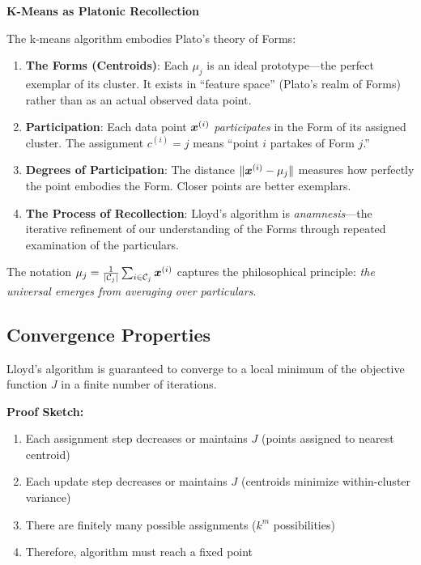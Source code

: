 \begin{philobox}
\textbf{K-Means as Platonic Recollection}

The k-means algorithm embodies Plato's theory of Forms:

\begin{enumerate}
    \item \textbf{The Forms (Centroids)}: Each $\mu_j$ is an ideal prototype---the perfect exemplar of its cluster. It exists in ``feature space'' (Plato's realm of Forms) rather than as an actual observed data point.
    
    \item \textbf{Participation}: Each data point $\bm{x}^{(i)}$ \textit{participates} in the Form of its assigned cluster. The assignment $c^{(i)} = j$ means ``point $i$ partakes of Form $j$.''
    
    \item \textbf{Degrees of Participation}: The distance $\| \bm{x}^{(i)} - \mu_j \|$ measures how perfectly the point embodies the Form. Closer points are better exemplars.
    
    \item \textbf{The Process of Recollection}: Lloyd's algorithm is \textit{anamnesis}---the iterative refinement of our understanding of the Forms through repeated examination of the particulars.
\end{enumerate}

The notation $\mu_j = \frac{1}{|\mathcal{C}_j|} \sum_{i \in \mathcal{C}_j} \bm{x}^{(i)}$ captures the philosophical principle: \textit{the universal emerges from averaging over particulars}.
\end{philobox}

\subsection{Convergence Properties}

\begin{theorem}
Lloyd's algorithm is guaranteed to converge to a local minimum of the objective function $J$ in a finite number of iterations.

\textbf{Proof Sketch:}
\begin{enumerate}
    \item Each assignment step decreases or maintains $J$ (points assigned to nearest centroid)
    \item Each update step decreases or maintains $J$ (centroids minimize within-cluster variance)
    \item There are finitely many possible assignments ($k^m$ possibilities)
    \item Therefore, algorithm must reach a fixed point
\end{enumerate}
\end{theorem}

